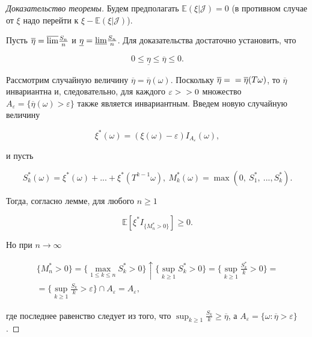 \begin{proof}[Доказательство теоремы] Будем предполагать $\mathbb{E}(\xi|\mathscr{J}) = 0$ (в противном случае от $\xi$ надо перейти к $\xi - \mathbb{E}(\xi|\mathscr{J})$). 

Пусть $\overline{\rm \eta} = \overline{\rm lim}\frac{S_n}{n}$ и $\underline{\eta} = \underline{\rm lim}\frac{S_n}{n}$. Для доказательства достаточно установить, что

{\centering 
$$0 \leq \underline{\eta} \leq \overline{\eta} \leq 0.$$
\par}

Рассмотрим случайную величину $\overline{\eta} = \overline{\eta}(\omega)$. Поскольку $\overline{\eta} = \\ = \overline{\eta}(T\omega)$, то $\overline{\eta}$ инвариантна и, следовательно, для каждого $\varepsilon > \\ > 0$ множество $A_{\varepsilon} = \{\overline{\eta}(\omega) > \varepsilon\}$ также является инвариантным. Введем новую случайную величину

{\centering 
$$\xi^*(\omega) = (\xi(\omega) - \varepsilon)I_{A_{\varepsilon}}(\omega),$$
\par}

и пусть

{\centering 
$$S_k^*(\omega) = \xi^*(\omega) + ... + \xi^*(T^{k-1}\omega), ~M_k^*(\omega) = \max(0, ~S_1^*, ~..., S_k^*).$$
\par}

Тогда, согласно лемме, для любого $n \geq 1$

{\centering 
$$\mathbb{E}[\xi^*I_{\{M_n^* > 0\}}] \geq 0.$$
\par}

Но при $n \rightarrow \infty$

{\centering 
\begin{equation}
	\begin{gathered}
		\{M_n^* > 0\} = \{\max_{1 \leq k \leq n}S_k^* > 0\}\uparrow \{\sup_{ k \geq 1}S_k^* > 0\} = \{\sup_{ k \geq 1}\frac{S_k^*}{k} > 0\} =  \\
		= \{\sup_{ k \geq 1}\frac{S_k}{k} > \varepsilon\} \cap A_{\varepsilon} = A_{\varepsilon},
	\end{gathered}
\end{equation}
\par}

где последнее равенство следует из того, что $\sup_{ k \geq 1}\frac{S_k}{k} \geq \overline{\eta}$, а $A_{\varepsilon} = \{\omega: \overline{\eta} > \varepsilon\}$.


\end{proof}
